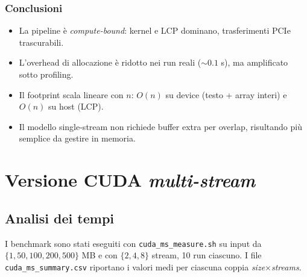 			\subsubsection*{Conclusioni}
				\begin{itemize}
						\item La pipeline è \emph{compute-bound}: kernel e LCP dominano, trasferimenti PCIe trascurabili.
						\item L’overhead di allocazione è ridotto nei run reali (\(\sim 0.1\) s), ma amplificato sotto profiling.
						\item Il footprint scala lineare con \(n\): \(O(n)\) su device (testo + array interi) e \(O(n)\) su host (LCP).
						\item Il modello single-stream non richiede buffer extra per overlap, risultando più semplice da gestire in memoria.
				\end{itemize}
	
	\section{Versione CUDA \emph{multi-stream}}
		
		\subsection{Analisi dei tempi}
			
			I benchmark sono stati eseguiti con \texttt{cuda\_ms\_measure.sh} su input da \(\{1,50,100,200,500\}\) MB e con \(\{2,4,8\}\) stream, 10 run ciascuno.
			I file \texttt{cuda\_ms\_summary.csv} riportano i valori medi per ciascuna coppia \emph{size\(\times\)streams}.
			
